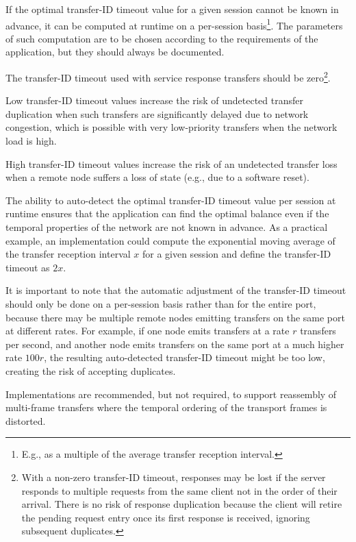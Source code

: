 If the optimal transfer-ID timeout value for a given session cannot be known in advance,
it can be computed at runtime on a per-session basis\footnote{%
    E.g., as a multiple of the average transfer reception interval.
}.
The parameters of such computation are to be chosen according to the requirements of the application,
but they should always be documented.

The transfer-ID timeout used with service response transfers should be zero\footnote{%
    With a non-zero transfer-ID timeout, responses may be lost if the server responds to multiple requests
    from the same client not in the order of their arrival.
    There is no risk of response duplication because the client will retire the pending request entry
    once its first response is received, ignoring subsequent duplicates.
}.

\begin{remark}
    Low transfer-ID timeout values increase the risk of undetected transfer duplication when such transfers
    are significantly delayed due to network congestion,
    which is possible with very low-priority transfers when the network load is high.

    High transfer-ID timeout values increase the risk of an undetected transfer loss
    when a remote node suffers a loss of state (e.g., due to a software reset).

    The ability to auto-detect the optimal transfer-ID timeout value per session at runtime ensures that the
    application can find the optimal balance even if the temporal properties of the network are not known in advance.
    As a practical example, an implementation could compute the exponential moving average of the
    transfer reception interval $x$ for a given session and define the transfer-ID timeout as $2x$.

    It is important to note that the automatic adjustment of the transfer-ID timeout should only be done
    on a per-session basis rather than for the entire port, because there may be multiple remote nodes
    emitting transfers on the same port at different rates.
    For example, if one node emits transfers at a rate $r$ transfers per second, and another node emits transfers
    on the same port at a much higher rate $100r$, the resulting auto-detected transfer-ID timeout might be
    too low, creating the risk of accepting duplicates.
\end{remark}

Implementations are recommended, but not required, to support reassembly of
multi-frame transfers where the temporal ordering of the transport frames is distorted.

